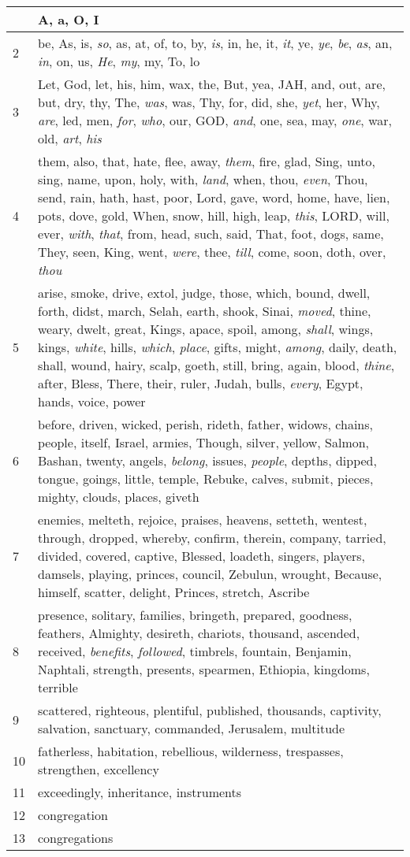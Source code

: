 \begin{longtable}{l|p{3.75in}}
\hline \hline
\endlastfoot
1 & A, a, O, I \\ \hline
2 & be, As, is, \emph{so}, as, at, of, to, by, \emph{is}, in, he, it, \emph{it}, ye, \emph{ye}, \emph{be}, \emph{as}, an, \emph{in}, on, us, \emph{He}, \emph{my}, my, To, lo \\ \hline
3 & Let, God, let, his, him, wax, the, But, yea, JAH, and, out, are, but, dry, thy, The, \emph{was}, was, Thy, for, did, she, \emph{yet}, her, Why, \emph{are}, led, men, \emph{for}, \emph{who}, our, GOD, \emph{and}, one, sea, may, \emph{one}, war, old, \emph{art}, \emph{his} \\ \hline
4 & them, also, that, hate, flee, away, \emph{them}, fire, glad, Sing, unto, sing, name, upon, holy, with, \emph{land}, when, thou, \emph{even}, Thou, send, rain, hath, hast, poor, Lord, gave, word, home, have, lien, pots, dove, gold, When, snow, hill, high, leap, \emph{this}, LORD, will, ever, \emph{with}, \emph{that}, from, head, such, said, That, foot, dogs, same, They, seen, King, went, \emph{were}, thee, \emph{till}, come, soon, doth, over, \emph{thou} \\ \hline
5 & arise, smoke, drive, extol, judge, those, which, bound, dwell, forth, didst, march, Selah, earth, shook, Sinai, \emph{moved}, thine, weary, dwelt, great, Kings, apace, spoil, among, \emph{shall}, wings, kings, \emph{white}, hills, \emph{which}, \emph{place}, gifts, might, \emph{among}, daily, death, shall, wound, hairy, scalp, goeth, still, bring, again, blood, \emph{thine}, after, Bless, There, their, ruler, Judah, bulls, \emph{every}, Egypt, hands, voice, power \\ \hline
6 & before, driven, wicked, perish, rideth, father, widows, chains, people, itself, Israel, armies, Though, silver, yellow, Salmon, Bashan, twenty, angels, \emph{belong}, issues, \emph{people}, depths, dipped, tongue, goings, little, temple, Rebuke, calves, submit, pieces, mighty, clouds, places, giveth \\ \hline
7 & enemies, melteth, rejoice, praises, heavens, setteth, wentest, through, dropped, whereby, confirm, therein, company, tarried, divided, covered, captive, Blessed, loadeth, singers, players, damsels, playing, princes, council, Zebulun, wrought, Because, himself, scatter, delight, Princes, stretch, Ascribe \\ \hline
8 & presence, solitary, families, bringeth, prepared, goodness, feathers, Almighty, desireth, chariots, thousand, ascended, received, \emph{benefits}, \emph{followed}, timbrels, fountain, Benjamin, Naphtali, strength, presents, spearmen, Ethiopia, kingdoms, terrible \\ \hline
9 & scattered, righteous, plentiful, published, thousands, captivity, salvation, sanctuary, commanded, Jerusalem, multitude \\ \hline
10 & fatherless, habitation, rebellious, wilderness, trespasses, strengthen, excellency \\ \hline
11 & exceedingly, inheritance, instruments \\ \hline
12 & congregation \\ \hline
13 & congregations \\ \hline
\end{longtable}
